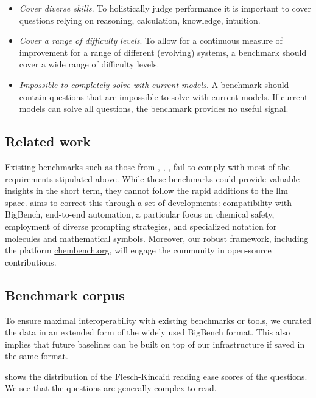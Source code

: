 \begin{itemize}
    \item \emph{Cover diverse skills}. To holistically judge performance it is important to cover questions relying on reasoning, calculation, knowledge, intuition. 
    \item \emph{Cover a range of difficulty levels}. To allow for a continuous measure of improvement for a range of different (evolving) systems, a benchmark should cover a wide range of difficulty levels.
    \item \emph{Impossible to completely solve with current models}. A benchmark should contain questions that are impossible to solve with current models. If current models can solve all questions, the benchmark provides no useful signal.
\end{itemize}

\subsection{Related work}
Existing benchmarks such as those from \textcite{guo2023large}, \textcite{sun2023scieval}, \textcite{Schulze_Balhorn_2024}, \textcite{Cai_2024} fail to comply with most of the requirements stipulated above. 
While these benchmarks could provide valuable insights in the short term, they cannot follow the rapid additions to the \gls{llm} space. 
\chembench aims to correct this through a set of developments: compatibility with BigBench, end-to-end automation, a particular focus on chemical safety, employment of diverse prompting strategies, and specialized notation for molecules and mathematical symbols. 
Moreover, our robust framework, including the platform \url{chembench.org}, will engage the community in open-source contributions.


\subsection{Benchmark corpus}
To ensure maximal interoperability with existing benchmarks or tools, we curated the data in an extended form of the widely used BigBench format.\autocite{srivastava2022beyond}
This also implies that future baselines can be built on top of our infrastructure if saved in the same format.


 shows the distribution of the Flesch-Kincaid reading ease scores of the questions.  
We see that the questions are generally complex to read. 



